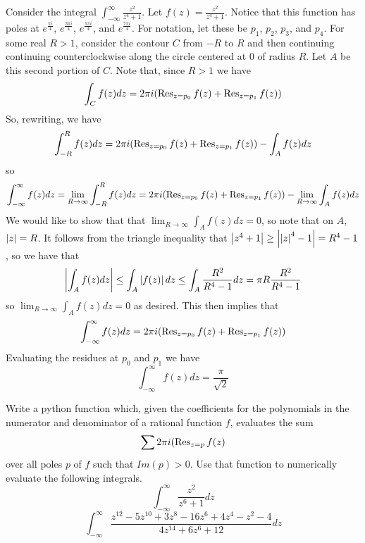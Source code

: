 Consider the integral $\int_{-\infty}^{\infty}\frac{z^2}{z^4+1}$. Let $f(z)=\frac{z^2}{z^4+1}$.
Notice that this function has poles at $e^{\frac{\pi i}{4}}$, $e^{\frac{3\pi i}{4}}$, $e^{\frac{5\pi i}{4}}$, and $e^{\frac{7\pi i}{4}}$.
For notation, let these be $p_1$, $p_2$, $p_3$, and $p_4$.
For some real $R>1$, consider the contour $C$ from $-R$ to $R$ and then continuing continuing counterclockwise along the circle centered at $0$ of radius $R$.
Let $A$ be this second portion of $C$.
Note that, since $R>1$ we have
\begin{equation*}
\int_C f(z)dz = 2\pi i (\operatorname{Res}_{z=p_0} f(z) +\operatorname{Res}_{z=p_1} f(z))
\end{equation*}
So, rewriting, we have
\begin{equation*}
\int_{-R}^R f(z) dz = 2\pi i (\operatorname{Res}_{z=p_0} f(z) +\operatorname{Res}_{z=p_1} f(z)) - \int_A f(z) dz
\end{equation*}
so
\begin{equation*}
\int_{-\infty}^{\infty} f(z) dz = \lim_{R\to \infty} \int_{-R}^R f(z) dz = 2\pi i (\operatorname{Res}_{z=p_0} f(z) +\operatorname{Res}_{z=p_1} f(z)) - \lim_{R\to \infty} \int_A f(z) dz
\end{equation*}
We would like to show that that $\lim_{R\to\infty} \int_A f(z) dz = 0$, so note that on $A$, $\left\lvert z\right\rvert=R$.
It follows from the triangle inequality that $\left\lvert z^4+1\right\rvert\geq \left\lvert\left\lvert z\right\rvert^4-1\right\rvert = R^4 -1$, so we have that 
$$\left\lvert\int_A f(z) dz\right\rvert\leq \int_A \left\lvert f(z)\right\rvert dz \leq \int_A \frac{R^2}{R^4 -1}dz = \pi R \frac{R^2}{R^4-1}$$
so $\lim_{R\to\infty} \int_A f(z) dz = 0$ as desired.
This then implies that 
\begin{equation*}
 \int_{-\infty}^{\infty} f(z) dz = 2\pi i (\operatorname{Res}_{z=p_0} f(z) +\operatorname{Res}_{z=p_1} f(z))
\end{equation*}
Evaluating the residues at $p_0$ and $p_1$ we have
$$\int_{-\infty}^{\infty} f(z) dz = \frac{\pi}{\sqrt{2}}$$

\begin{problem}
Write a python function which, given the coefficients for the polynomials in the numerator and denominator of a rational function $f$, evaluates the sum
\begin{equation*}
\sum 2\pi i (\operatorname{Res}_{z=p} f(z)
\end{equation*}
over all poles $p$ of $f$ such that $Im(p)>0$.
Use that function to numerically evaluate the following integrals.
$$\int_{-\infty}^{\infty} \frac{z^2}{z^6+1}dz$$
$$\int_{-\infty}^{\infty} \frac{z^{12}-5z^{10}+3z^8-16z^6+4z^4-z^2-4}{4z^{14}+6z^6+12}dz$$
\end{problem}

